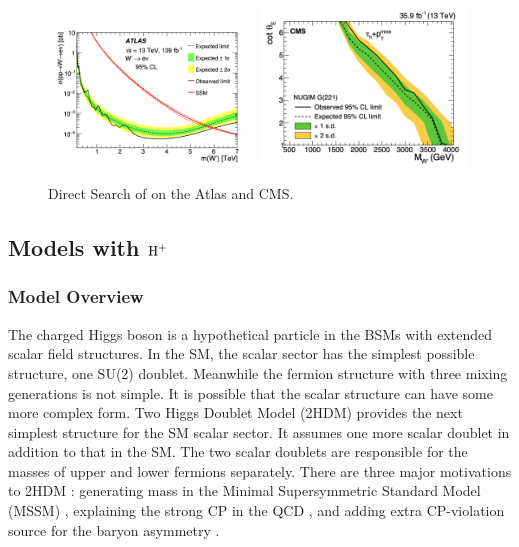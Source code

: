 \begin{figure}
    \centering
    \includegraphics[width=0.49\textwidth]{chapters/RelatedWorks/sectionBSM/figures/WPrime_search0.png} 
    \includegraphics[width=0.49\textwidth]{chapters/RelatedWorks/sectionBSM/figures/WPrime_search.png} 
    \caption{Direct Search of \PWpr on the Atlas and CMS.}
    \label{fig:relatedWorks:bsm:WPrime:directSearch}
\end{figure}






\FloatBarrier






\subsection{Models with $\rm H^+$}
\label{sec:relatedWorks:bsm:chargedHiggs}

\subsubsection{Model Overview}
The charged Higgs boson \PSHp is a hypothetical particle in the BSMs with extended scalar field structures. In the SM, the scalar sector has the simplest possible structure, one SU(2) doublet. Meanwhile the fermion structure with three mixing generations is not simple. It is possible that the scalar structure can have some more complex form. Two Higgs Doublet Model (2HDM) provides the next simplest structure for the SM scalar sector. It assumes one more scalar doublet in addition to that in the SM. The two scalar doublets are responsible for the masses of upper and lower fermions separately. There are three major motivations to 2HDM \cite{BRANCO20121}: generating mass in the Minimal Supersymmetric Standard Model (MSSM) \cite{HABER198575}, explaining the strong CP in the QCD \cite{KIM19871, PhysRevLett.38.1440}, and adding extra CP-violation source for the baryon asymmetry \cite{Trodden:1998qg, TUROK1991471, Joyce:1994zt}. 

